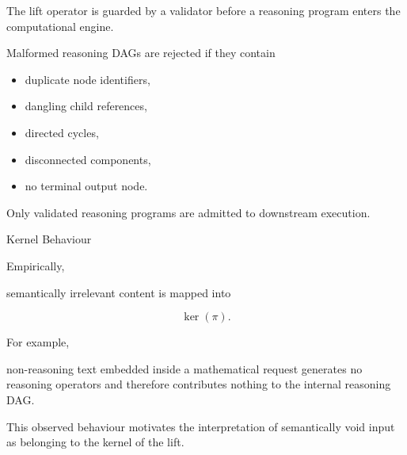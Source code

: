 
\begin{highlightbox}


\BodyFont

The lift operator is guarded by a validator before a reasoning program
enters the computational engine.

Malformed reasoning DAGs are rejected if they contain

\begin{itemize}

\item duplicate node identifiers,

\item dangling child references,

\item directed cycles,

\item disconnected components,

\item no terminal output node.

\end{itemize}

Only validated reasoning programs are admitted to downstream execution.

\end{highlightbox}


\begin{mosbox}{Kernel Behaviour}

\BodyFont

Empirically,

semantically irrelevant content is mapped into

\[
\boxed{
\ker(\pi).
}
\]

For example,

non-reasoning text embedded inside a mathematical request generates no
reasoning operators and therefore contributes nothing to the internal
reasoning DAG.

This observed behaviour motivates the interpretation of semantically
void input as belonging to the kernel of the lift.

\end{mosbox}

